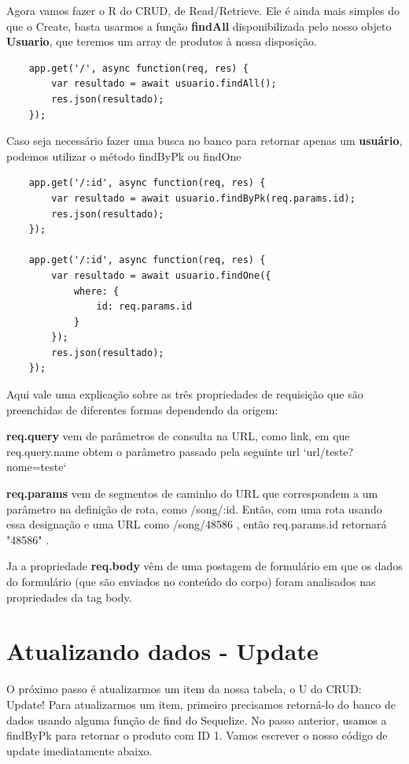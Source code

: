 Agora vamos fazer o R do CRUD, de Read/Retrieve. Ele é ainda mais simples do que o Create, basta usarmos a função \textbf{findAll} disponibilizada pelo nosso objeto \textbf{Usuario}, que teremos um array de produtos à nossa disposição. 

\begin{verbatim}
	app.get('/', async function(req, res) {
		var resultado = await usuario.findAll();
		res.json(resultado);
	});
\end{verbatim}

Caso seja necessário fazer uma busca no banco para retornar apenas um \textbf{usuário}, podemos utilizar o método findByPk ou findOne

\begin{verbatim}
	app.get('/:id', async function(req, res) {
		var resultado = await usuario.findByPk(req.params.id);
		res.json(resultado);
	});

	app.get('/:id', async function(req, res) {
		var resultado = await usuario.findOne({
			where: {
				id: req.params.id
			}
		});
		res.json(resultado);
	});
\end{verbatim}

Aqui vale uma explicação sobre as três propriedades de requisição que são preenchidas de diferentes formas dependendo da origem:

\textbf{req.query} vem de parâmetros de consulta na URL, como link, em que req.query.name obtem o parâmetro passado pela seguinte url `url/teste?nome=teste`

\textbf{req.params} vem de segmentos de caminho do URL que correspondem a um parâmetro na definição de rota, como /song/:id. Então, com uma rota usando essa designação e uma URL como /song/48586 , então req.params.id retornará "48586" .

Ja a  propriedade \textbf{req.body} vêm de uma postagem de formulário em que os dados do formulário (que são enviados no conteúdo do corpo) foram analisados nas propriedades da tag body.

\section{Atualizando dados - Update}

O próximo passo é atualizarmos um item da nossa tabela, o U do CRUD: Update! Para atualizarmos um item, primeiro precisamos retorná-lo do banco de dados usando alguma função de find do Sequelize. No passo anterior, usamos a findByPk para retornar o produto com ID 1. Vamos escrever o nosso código de update imediatamente abaixo.


